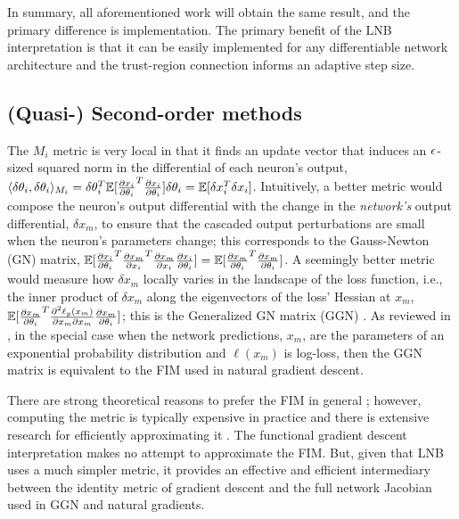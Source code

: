 In summary, all aforementioned work will obtain the same result, and the primary difference
is implementation. The primary benefit of the LNB interpretation is that it can be easily
implemented for any differentiable network architecture and the trust-region connection
informs an adaptive step size.

\subsection{(Quasi-) Second-order methods}
The $M_i$ metric is very local in that it finds
an update vector that induces an ${\epsilon}$-sized squared norm in the differential of each neuron's output,
$\langle \delta\theta_i, \delta\theta_i \rangle_{M_i} =
\delta\theta_i^T \mathbb{E}[\frac{\partial x_i}{\partial \theta_i}^T\frac{\partial x_i}{\partial \theta_i}] \delta\theta_i
= \mathbb{E}[\delta x_i^T \delta x_i]$.
Intuitively, a better metric would compose the neuron's output differential with the change in the \emph{network's}
output differential, $\delta x_m$, to ensure that the cascaded output perturbations are small when the neuron's parameters
change; this corresponds to the Gauss-Newton (GN) matrix,
$\mathbb{E}[\frac{\partial x_i}{\partial \theta_i}^T \frac{\partial x_m}{\partial x_i}^T\frac{\partial x_m}{\partial x_i} \frac{\partial x_i}{\partial \theta_i}]
= \mathbb{E}[\frac{\partial x_m}{\partial \theta_i}^T\frac{\partial x_m}{\partial \theta_i}]$.
A seemingly better metric would measure how $\delta x_m$ locally varies in the landscape
of the loss function, i.e., the inner product of $\delta x_m$ along the eigenvectors of the 
loss' Hessian at $x_m$,
$\mathbb{E}[\frac{\partial x_m}{\partial \theta_i}^T \frac{\partial^2 \ell_y(x_m)}{\partial x_m \partial x_m}  \frac{\partial x_m}{\partial \theta_i}]$;
this is the Generalized GN matrix (GGN) \citep{Schraudolph2002}.
As reviewed in \citet{kunster2019},
in the special case when the network predictions, $x_m$, are the parameters of an exponential probability
distribution and $\ell(x_m)$ is log-loss, then the GGN matrix is equivalent to the FIM used in
natural gradient descent.

There are strong theoretical reasons to prefer the FIM in general
\citep{amari1998,martens2020}; however,
computing the metric is typically expensive in practice and there is
extensive research for efficiently approximating it
\citep{martens2015,Ren2021TensorNT}.
The functional gradient descent interpretation makes no attempt to approximate the FIM.
But, given that LNB uses a much simpler metric, it
provides an effective and efficient intermediary between the identity metric of gradient descent
and the full network Jacobian used in GGN and natural gradients.
